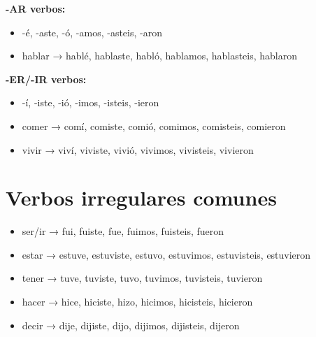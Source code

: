 \documentclass[a4paper,11pt]{article}
\begin{document}
\textbf{-AR verbos:}

\begin{itemize}

  \item -é, -aste, -ó, -amos, -asteis, -aron

  \item hablar → hablé, hablaste, habló, hablamos, hablasteis, hablaron

\end{itemize}

\vspace{0.2cm}

\textbf{-ER/-IR verbos:}

\begin{itemize}

  \item -í, -iste, -ió, -imos, -isteis, -ieron

  \item comer → comí, comiste, comió, comimos, comisteis, comieron

  \item vivir → viví, viviste, vivió, vivimos, vivisteis, vivieron

\end{itemize}

\vspace{0.2cm}

\section{Verbos irregulares comunes}

\begin{itemize}

  \item ser/ir → fui, fuiste, fue, fuimos, fuisteis, fueron

  \item estar → estuve, estuviste, estuvo, estuvimos, estuvisteis, estuvieron

  \item tener → tuve, tuviste, tuvo, tuvimos, tuvisteis, tuvieron

  \item hacer → hice, hiciste, hizo, hicimos, hicisteis, hicieron

  \item decir → dije, dijiste, dijo, dijimos, dijisteis, dijeron

\end{itemize}

\vspace{0.2cm}
\end{document}
